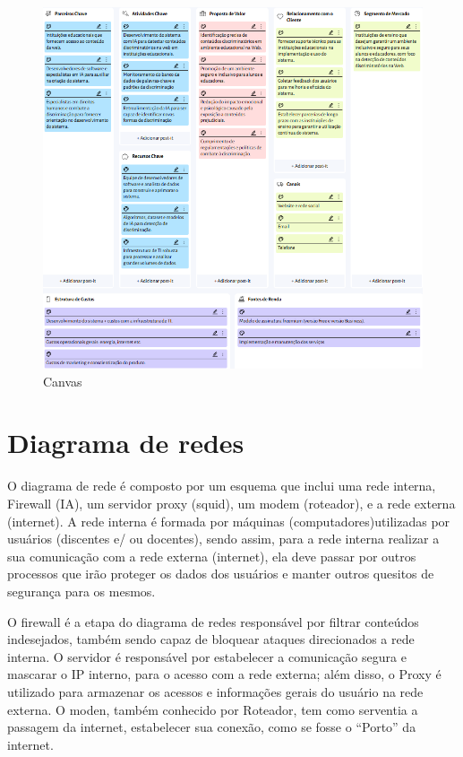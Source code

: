 \documentclass[
  a4paper,%
  12pt,%
  english,%
  brazilian,%
]{article}
\begin{document}
    \begin{figure}[H]
        \centering
        \caption{Canvas}
        \label{fig:can}
        \includegraphics[width=\textwidth]{Logos/canvas.png}
    \end{figure}


    \section*{Diagrama de redes}

    O diagrama de rede  é composto por um esquema que inclui uma rede interna, Firewall (IA), um servidor proxy (squid), um modem (roteador), e a rede externa (internet). A rede interna é formada por máquinas (computadores)utilizadas por usuários (discentes e/ ou docentes), sendo assim, para a rede interna  realizar a sua comunicação com a rede externa (internet), ela deve passar por outros processos que irão proteger os dados dos usuários e manter outros quesitos de segurança para os mesmos. 

O firewall é a etapa do diagrama de redes responsável por filtrar conteúdos indesejados, também sendo capaz de bloquear ataques direcionados a rede interna. O servidor é responsável por estabelecer a comunicação segura e mascarar o IP interno, para o acesso com a rede externa; além disso, o Proxy é utilizado para armazenar os acessos e informações gerais do usuário na rede externa. O moden, também conhecido por Roteador, tem como serventia a passagem da internet, estabelecer sua conexão, como se fosse o “Porto” da internet.
\end{document}

